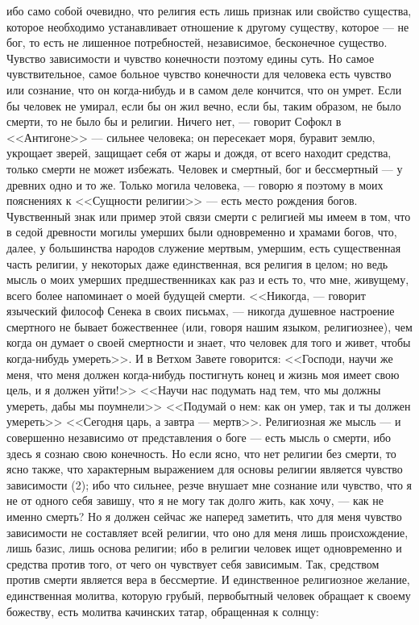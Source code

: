 \documentclass[12pt]{article}
\begin{document}
ибо само собой очевидно, что религия есть лишь признак или свойство существа, которое необходимо устанавливает отношение к другому существу, которое --- не бог, то есть не лишенное потребностей, независимое, бесконечное существо. Чувство зависимости и чувство конечности поэтому едины суть. Но самое чувствительное, самое больное чувство конечности для человека есть чувство или сознание, что он когда-нибудь и в самом деле кончится, что он умрет. Если бы человек не умирал, если бы он жил вечно, если бы, таким образом, не было смерти, то не было бы и религии. Ничего нет, --- говорит Софокл в <<Антигоне>>  --- сильнее человека; он пересекает моря, буравит землю, укрощает зверей, защищает себя от жары и дождя, от всего находит средства, только смерти не может избежать. Человек и смертный, бог и бессмертный --- у древних одно и то же. Только могила человека, --- говорю я поэтому в моих пояснениях к <<Сущности религии>>  --- есть место рождения богов. Чувственный знак или пример этой связи смерти с религией мы имеем в том, что в седой древности могилы умерших были одновременно и храмами богов, что, далее, у большинства народов служение мертвым, умершим, есть существенная часть религии, у некоторых даже единственная, вся религия в целом; но ведь мысль о моих умерших предшественниках как раз и есть то, что мне, живущему, всего более напоминает о моей будущей смерти. <<Никогда, --- говорит языческий философ Сенека в своих письмах, --- никогда душевное настроение смертного не бывает божественнее (или, говоря нашим языком, религиознее), чем когда он думает о своей смертности и знает, что человек для того и живет, чтобы когда-нибудь умереть>>. И в Ветхом Завете говорится: <<Господи, научи же меня, что меня должен когда-нибудь постигнуть конец и жизнь моя имеет свою цель, и я должен уйти!>>  <<Научи нас подумать над тем, что мы должны умереть, дабы мы поумнели>>  <<Подумай о нем: как он умер, так и ты должен умереть>>  <<Сегодня царь, а завтра --- мертв>>. Религиозная же мысль --- и совершенно независимо от представления о боге --- есть мысль о смерти, ибо здесь я сознаю свою конечность. Но если ясно, что нет религии без смерти, то ясно также, что характерным выражением для основы религии является чувство зависимости (2); ибо что сильнее, резче внушает мне сознание или чувство, что я не от одного себя завишу, что я не могу так долго жить, как хочу, --- как не именно смерть? Но я должен сейчас же наперед заметить, что для меня чувство зависимости не составляет всей религии, что оно для меня лишь происхождение, лишь базис, лишь основа религии; ибо в религии человек ищет одновременно и средства против того, от чего он чувствует себя зависимым. Так, средством против смерти является вера в бессмертие. И единственное религиозное желание, единственная молитва, которую грубый, первобытный человек обращает к своему божеству, есть молитва качинских татар, обращенная к солнцу: 
\end{document}
